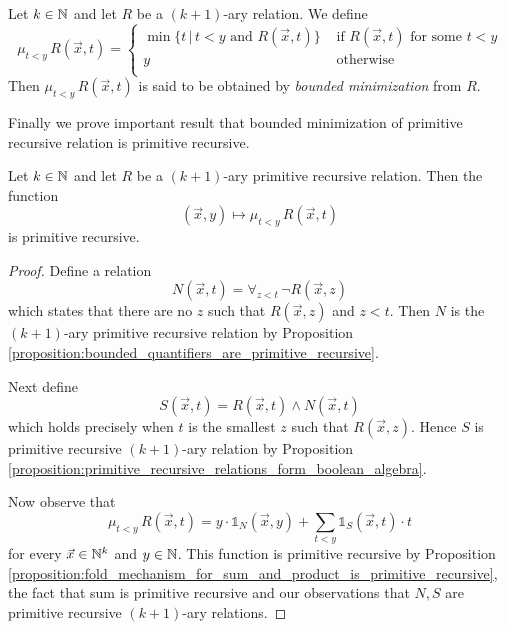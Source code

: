 \documentclass[10pt]{amsart}
\begin{document}
\begin{definition}
	Let $k \in {\mathbb N}$ and let $R$ be a $(k + 1)$-ary relation. We define
	$$\mu_{t < y}\,R\left(\vec{x},t\right) =
		\begin{cases}
			\min \{t\,|\,t < y\mbox{ and }R\left(\vec{x},t\right)\} & \mbox{ if }R\left(\vec{x},t\right)\mbox{ for some }t < y \\
			y                                                       & \mbox{ otherwise }                                       \\
		\end{cases}
	$$
	Then $\mu_{t < y}\,R\left(\vec{x},t\right)$ is said to be obtained by \textit{bounded minimization} from $R$.
\end{definition}
\noindent
Finally we prove important result that bounded minimization of primitive recursive relation is primitive recursive.

\begin{proposition}\label{proposition:bounded_minimization_is_primitive_recursive_if_relation_is_primitive_recursive}
	Let $k \in {\mathbb N}$ and let $R$ be a $(k + 1)$-ary primitive recursive relation. Then the function
	$$(\vec{x},y)\mapsto \mu_{t < y}\,R\left(\vec{x},t\right)$$
	is primitive recursive.
\end{proposition}
\begin{proof}
	Define a relation
	$$N(\vec{x},t) = \forall_{z < t}\,\neg R\left(\vec{x},z\right)$$
	which states that there are no $z$ such that $R(\vec{x},z)$ and $z < t$.
	Then $N$ is the $(k+1)$-ary primitive recursive relation by Proposition \ref{proposition:bounded_quantifiers_are_primitive_recursive}.

	Next define
	$$S(\vec{x},t) = R(\vec{x},t)\wedge N(\vec{x},t)$$
	which holds precisely when $t$ is the smallest $z$ such that $R(\vec{x},z)$. Hence $S$ is primitive recursive $(k+1)$-ary relation by Proposition \ref{proposition:primitive_recursive_relations_form_boolean_algebra}.

	Now observe that
	$$\mu_{t < y}\,R\left(\vec{x},t\right) = y\cdot \mathbb{1}_N\left(\vec{x},y\right) + \sum_{t < y}\mathbb{1}_{S}\left(\vec{x},t\right)\cdot t$$
	for every $\vec{x} \in {\mathbb N}^k$ and $y \in {\mathbb N}$. This function is primitive recursive by Proposition \ref{proposition:fold_mechanism_for_sum_and_product_is_primitive_recursive}, the fact that sum is primitive recursive and our observations that $N,S$ are primitive recursive $(k + 1)$-ary relations.
\end{proof}
\end{document}
